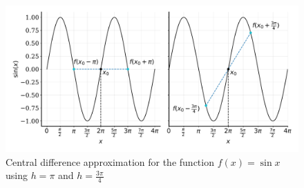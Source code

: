 \begin{figure}
    \centering
    \includegraphics[width=\textwidth]{figures/central_periodic.pdf}
    \caption[Central difference approximation for periodic function]{Central difference approximation for the function $f(x) = \sin{x}$ using $h = \pi$ and $h = \frac{3 \pi}{4}$}
    \label{fig:central_periodic}
\end{figure}